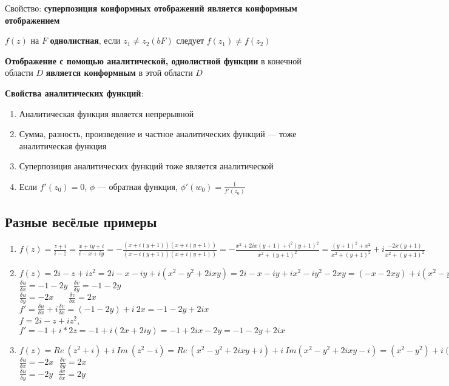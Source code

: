 \documentclass{article}
\begin{document}
Свойство: \textbf{суперпозиция конформных отображений является конформным отображением}

\hfill

$f(z)$ на $F$ \textbf{однолистная}, если $z_1 \ne z_2 (b F)$ следует $f(z_1) \ne f(z_2)$

\textbf{Отображение с помощью аналитической, однолистной функции} в конечной области $D$ \textbf{является конформным} в этой области $D$

\hfill

\textbf{Свойства аналитических функций}:

\begin{enumerate}
    \item Аналитическая функция является непрерывной
    \item Сумма, разность, произведение и частное аналитических функций — тоже аналитическая функция
    \item Суперпозиция аналитических функций тоже является аналитической
    \item Если $f'(z_0) = 0$, $\phi$ — обратная функция, $\phi'(w_0) = \frac{1}{f'(z_0)}$
\end{enumerate}

\subsection{Разные весёлые примеры}

\begin{enumerate}
    \item $f(z) = \frac{z + i}{i - \overline{z}} = \frac{x + i y + i}{i - x + i y} = -\frac{(x + i (y + 1))(x + i (y + 1))}{(x - i (y + 1))(x + i (y + 1))} = -\frac{x^2 + 2 i x (y + 1) + i^2 (y + 1)^2}{x^2 + (y + 1)^2} = \frac{(y + 1)^2 + x^2}{x^2 + (y + 1)^2} + i \frac{- 2 x (y + 1)}{x^2 + (y + 1)^2}$
    \item $f(z) = 2 i - z + i z^2 = 2 i - x - i y + i (x^2 - y^2 + 2 i x y) = 2 i - x - i y + i x^2 - i y^2 - 2 x y = (-x - 2 x y) + i (x^2 - y - y^2 + 2)$ \\
    $\frac{\delta u}{\delta x} = - 1 - 2 y \ \ \ \frac{\delta v}{\delta y} = - 1 - 2 y$ \\
    $\frac{\delta u}{\delta y} = - 2 x \ \ \ \ \ \ \ \  \frac{\delta v}{\delta x} = 2 x$ \\
    $f' = \frac{\delta u}{\delta x} + i \frac{\delta v}{\delta x} = (-1 - 2 y) + i \ 2 x = -1 - 2 y + 2 i x$ \\
    $f = 2 i - z + i z^2$, $f' = - 1 + i * 2 z = -1 + i (2 x + 2 i y) = -1 + 2 i x - 2 y = -1 - 2 y + 2 i x$
    \item $f(z) = Re \ (z^2 + i) + i \ Im \ (z^2 - i) = Re \ (x^2 - y^2 + 2 i x y + i) + i \ Im (x^2 - y^2 + 2 i x y - i) = (x^2 - y^2) + i (2 x y - 1)$ \\
    $\frac{\delta u}{\delta x} = - 2 x \ \ \ \frac{\delta v}{\delta y} = 2 x$ \\
    $\frac{\delta u}{\delta y} = - 2 y \ \ \  \frac{\delta v}{\delta x} = 2 y$ \\
\end{enumerate}
\end{document}
